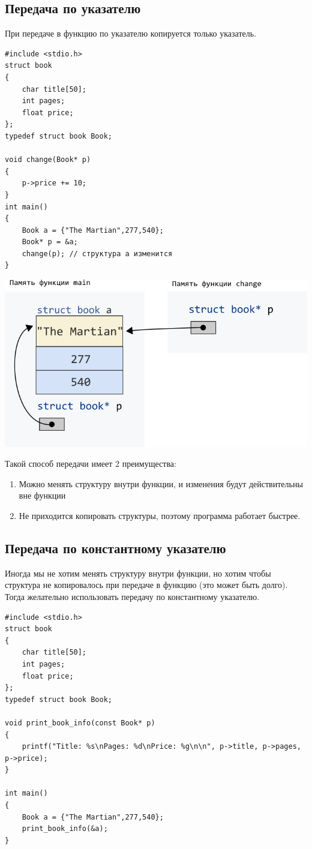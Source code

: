 \documentclass[10pt]{article}
\begin{document}
\subsection*{Передача по указателю}
При передаче в функцию по указателю копируется только указатель.
\begin{multicols}{2}
\begin{lstlisting}
#include <stdio.h>
struct book 
{
    char title[50];
    int pages;
    float price;
};
typedef struct book Book;

void change(Book* p) 
{
    p->price += 10;
}
int main() 
{
    Book a = {"The Martian",277,540};
    Book* p = &a;
    change(p); // структура a изменится
}
\end{lstlisting}
\vfill\null
\columnbreak
\begin{center}
\includegraphics[scale=0.5]{../images/structpassbypointer.png}
\end{center}
\end{multicols}

\noindent Такой способ передачи имеет 2 преимущества:
\begin{enumerate}
\item Можно менять структуру внутри функции, и изменения будут действительны вне функции
\item Не приходится копировать структуры, поэтому программа работает быстрее.
\end{enumerate}

\subsection*{Передача по константному указателю}
Иногда мы не хотим менять структуру внутри функции, но хотим чтобы структура не копировалось при передаче в функцию (это может быть долго). Тогда желательно использовать передачу по константному указателю.
\begin{lstlisting}
#include <stdio.h>
struct book 
{
    char title[50];
    int pages;
    float price;
};
typedef struct book Book;

void print_book_info(const Book* p) 
{
    printf("Title: %s\nPages: %d\nPrice: %g\n\n", p->title, p->pages, p->price);
}

int main() 
{
    Book a = {"The Martian",277,540};
    print_book_info(&a);
}
\end{lstlisting}
\newpage
\end{document}
